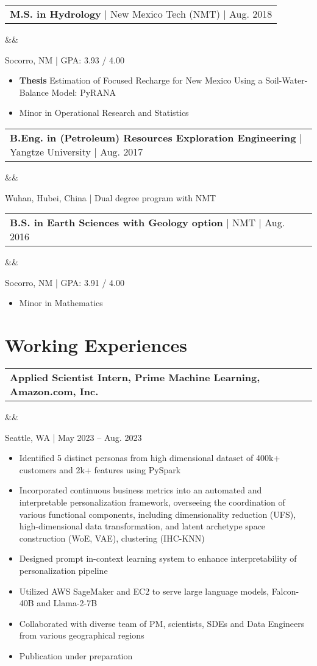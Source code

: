 \documentclass[12pt,letterpaper,sans]{moderncv}        %
\makeatletter
\newcommand*{\customcvproject}[4][.25em]{
  \begin{tabular}{@{}l} 
    {\bfseries #2} { #3}
  \end{tabular}


      

  \ifx&#4&%
  \else{\\%
    \begin{minipage}{\maincolumnwidth}%
      \small#4%
    \end{minipage}}\fi%
  \par\addvspace{#1}}
\makeatother
\begin{document}
{{\customcvproject{M.S. in Hydrology}{| New Mexico Tech (NMT) | Aug. 2018}
{}}
Socorro, NM | GPA: 3.93 / 4.00
\begin{itemize}
  \item \textbf{Thesis} Estimation of Focused Recharge for New Mexico Using a Soil-Water-Balance Model: PyRANA
  \item Minor in Operational Research and Statistics
\end{itemize}

{\customcvproject{B.Eng. in (Petroleum) Resources Exploration Engineering}{| Yangtze University | Aug. 2017}
{}}
Wuhan, Hubei, China | Dual degree program with NMT

{\customcvproject{B.S. in Earth Sciences with Geology option}{| NMT | Aug. 2016}
{}
}
Socorro, NM | GPA: 3.91 / 4.00
\begin{itemize}
  \item Minor in Mathematics
\end{itemize}

\section{Working Experiences}

{\customcvproject{Applied Scientist Intern, Prime Machine Learning, Amazon.com, Inc.}{}{}
}
Seattle, WA | May 2023 – Aug. 2023
\begin{itemize}
\item Identified 5 distinct personas from high dimensional dataset of 400k+ customers and 2k+ features using PySpark
\item Incorporated continuous business metrics into an automated and interpretable personalization framework, overseeing the coordination of various functional components, including dimensionality reduction (UFS), high-dimensional data transformation, and latent archetype space construction (WoE, VAE), clustering (IHC-KNN)
\item Designed prompt in-context learning system to enhance interpretability of personalization pipeline
\item Utilized AWS SageMaker and EC2 to serve large language models, Falcon-40B and Llama-2-7B
\item Collaborated with diverse team of PM, scientists, SDEs and Data Engineers from various geographical regions
\item Publication under preparation

 \end{itemize}
}
\end{document}
